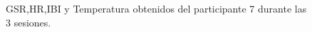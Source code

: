 \begin{figure}[h]
        \centering
        \caption{GSR,HR,IBI y Temperatura obtenidos del participante 7 durante las 3 sesiones.}\label{fig:data_p7}
\end{figure}
\pagebreak

